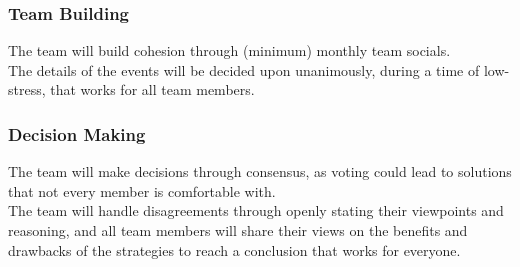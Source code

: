 \documentclass{article}
\begin{document}
\subsubsection*{Team Building}

The team will build cohesion through (minimum) monthly team socials.\\
\indent The details of the events will be decided upon unanimously, during a time of low-stress,
that works for all team members.

\subsubsection*{Decision Making} 

The team will make decisions through consensus, as voting could lead to solutions that
not every member is comfortable with.\\
\indent The team will handle disagreements through openly stating their viewpoints and
reasoning, and all team members will share their views on the benefits and drawbacks of
the strategies to reach a conclusion that works for everyone.
\end{document}
